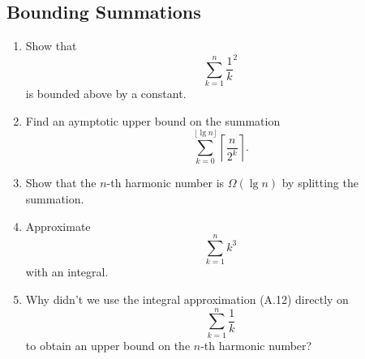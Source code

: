 \documentclass[AppendixA]{subfiles}
\begin{document}
	\subsection{Bounding Summations}

	\begin{enumerate}[leftmargin=\labelsep]
		\item Show that
		\[
			\sum_{k = 1}^n \frac{1}{k}^2
		\]
		is bounded above by a constant.
		\begin{answer}
			
		\end{answer}

		\item Find an aymptotic upper bound on the summation
		\[
			\sum_{k = 0}^{\lfloor \lg n \rfloor} \left\lceil \frac{n}{2^k} \right\rceil.
		\]
		\begin{answer}
			
		\end{answer}
		
		\item Show that the $n$-th harmonic number is $\Omega(\lg n)$ by splitting the summation.
		\begin{answer}
			
		\end{answer}
		
		\item Approximate
		\[
			\sum_{k = 1}^n k^3
		\]
		with an integral.
		\begin{answer}
			
		\end{answer}
		
		\item Why didn't we use the integral approximation (A.12) directly on
		\[
			\sum_{k = 1}^n \frac{1}{k}
		\]
		to obtain an upper bound on the $n$-th harmonic number?
		\begin{answer}
			
		\end{answer}
		
	\end{enumerate}
\end{document}
